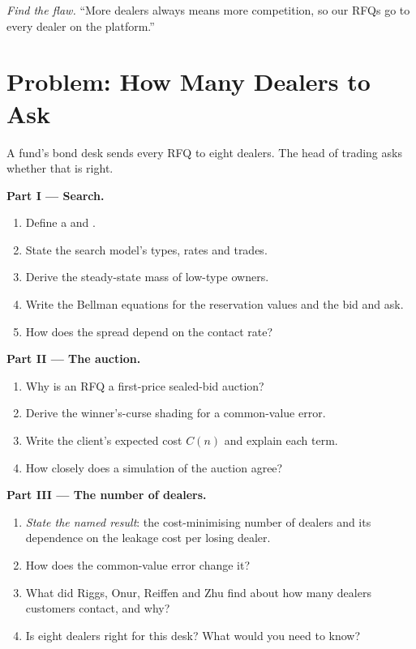 \begin{exercise}[$\star\star\star$]\label{exo:mx:request-for-quote-and-dealer-markets-in-theory:8}
\emph{Find the flaw.} ``More dealers always means more competition, so our RFQs go to every dealer on the platform.''
\end{exercise}

\section{Problem: How Many Dealers to Ask}

\begin{problem}\label{pb:mx:request-for-quote-and-dealer-markets-in-theory:1}
A fund's bond desk sends every RFQ to eight dealers. The head of trading asks whether that is right.

\medskip\noindent\textbf{Part I --- Search.}
\begin{enumerate}
\item Define a  and .
\item State the search model's types, rates and trades.
\item Derive the steady-state mass of low-type owners.
\item Write the Bellman equations for the reservation values and the bid and ask.
\item How does the spread depend on the contact rate?
\end{enumerate}

\medskip\noindent\textbf{Part II --- The auction.}
\begin{enumerate}[resume]
\item Why is an RFQ a first-price sealed-bid auction?
\item Derive the winner's-curse shading for a common-value error.
\item Write the client's expected cost $C(n)$ and explain each term.
\item How closely does a simulation of the auction agree?
\end{enumerate}

\medskip\noindent\textbf{Part III --- The number of dealers.}
\begin{enumerate}[resume]
\item \emph{State the named result}: the cost-minimising number of dealers and its dependence on the leakage cost per losing dealer.
\item How does the common-value error change it?
\item What did Riggs, Onur, Reiffen and Zhu find about how many dealers customers contact, and why?
\item Is eight dealers right for this desk? What would you need to know?
\end{enumerate}


\end{problem}
